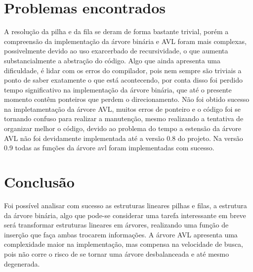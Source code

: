 \documentclass[11pt]{article}
\begin{document}
\section{Problemas encontrados}
A resolução da pilha e da fila se deram de forma bastante trivial, porém a compreensão da implementação da árvore binária e AVL foram mais complexas, possivelmente devido ao uso exarcerbado de recursividade, o que aumenta substancialmente a abstração do código. Algo que ainda apresenta uma dificuldade, é lidar com os erros do compilador, pois nem sempre são triviais a ponto de saber exatamente o que está acontecendo, por conta disso foi perdido tempo significativo na implementação da árvore binária, que até o presente momento contêm ponteiros que perdem o direcionamento.
Não foi obtido sucesso na impletamentação da árvore AVL, muitos erros de ponteiro e o código foi se tornando confuso para realizar a manutenção, mesmo realizando a tentativa de organizar melhor o código, devido ao problema do tempo a estensão da árvore AVL não foi devidamente implementada até a versão 0.8 do projeto. Na versão 0.9 todas as funções da árvore avl foram implementadas com sucesso.

\section{Conclusão}

Foi possível analisar com sucesso as estruturas lineares pilhas e filas, a estrutura da árvore binária, algo que pode-se considerar uma tarefa interessante em breve será transformar estruturas lineares em árvores, realizando uma função de inserção que faça ambas trocarem informações. A árvore AVL apresenta uma complexidade maior na implementação, mas compensa na velocidade de busca, pois não corre o risco de se tornar uma árvore desbalanceada e até mesmo degenerada.
\end{document}

